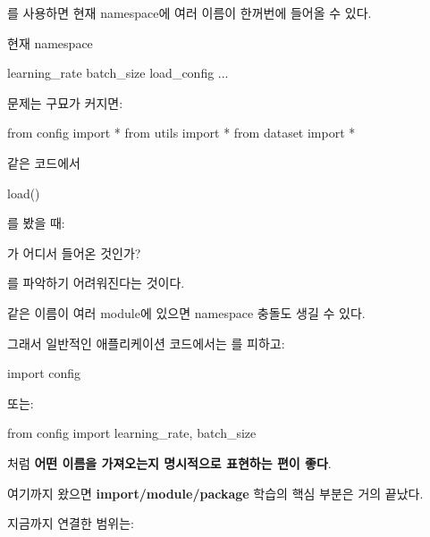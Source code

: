 를 사용하면 현재 namespace에 여러 이름이 한꺼번에 들어올 수 있다.

\begin{dhksmry}[centered]
현재 namespace

learning_rate
batch_size
load_config
...
\end{dhksmry}

문제는 구묘가 커지면:

\begin{dhkcode}
from config import *
from utils import *
from dataset import *
\end{dhkcode}

같은 코드에서

\begin{dhkcode}
load()
\end{dhkcode}

를 봤을 때:

\begin{dhksmry}[centered]
가 어디서 들어온 것인가?
\end{dhksmry}

를 파악하기 어려워진다는 것이다.

같은 이름이 여러 module에 있으면 namespace 충돌도 생길 수 있다.

그래서 일반적인 애플리케이션 코드에서는 를 피하고:

\begin{dhkcode}
import config
\end{dhkcode}

또는:

\begin{dhkcode}
from config import learning_rate, batch_size
\end{dhkcode}

처럼 \textbf{어떤 이름을 가져오는지 명시적으로 표현하는 편이 좋다}.

여기까지 왔으면 \textbf{import/module/package} 학습의 핵심 부분은 거의 끝났다.

지금까지 연결한 범위는:

